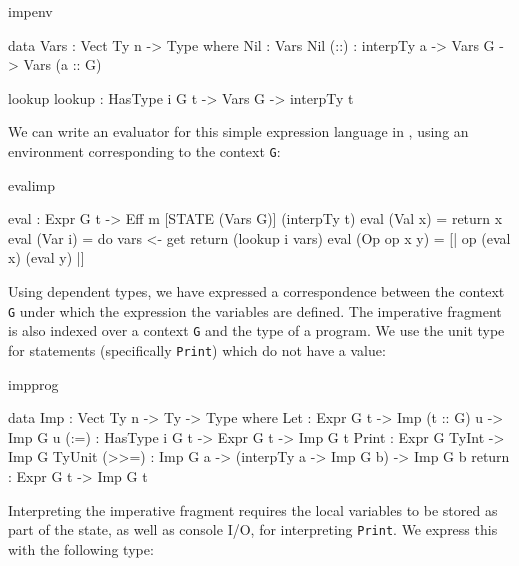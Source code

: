 \begin{SaveVerbatim}{impenv}

data Vars : Vect Ty n -> Type where
     Nil  : Vars Nil
     (::) : interpTy a -> Vars G -> Vars (a :: G)
\end{SaveVerbatim}

\begin{SaveVerbatim}{lookup}
lookup : HasType i G t -> Vars G -> interpTy t

\end{SaveVerbatim}

\noindent
We can write an evaluator for this simple expression language in
\Eff{}, using an environment corresponding to
the context \texttt{G}:

\begin{SaveVerbatim}{evalimp}

eval : Expr G t -> Eff m [STATE (Vars G)] (interpTy t)
eval (Val x) = return x
eval (Var i) = do vars <- get
                  return (lookup i vars) 
eval (Op op x y) = [| op (eval x) (eval y) |]

\end{SaveVerbatim}

\noindent
Using dependent types, we have expressed a correspondence between
the context \texttt{G} under which the expression 
the variables are defined.
The imperative fragment is also indexed over a context \texttt{G} and the
type of a program. We use the unit type for statements (specifically
\texttt{Print}) which do not have a value:

\begin{SaveVerbatim}{impprog}

data Imp    : Vect Ty n -> Ty -> Type where
     Let    : Expr G t -> Imp (t :: G) u -> Imp G u
     (:=)   : HasType i G t -> Expr G t -> Imp G t
     Print  : Expr G TyInt -> Imp G TyUnit
     (>>=)  : Imp G a -> 
              (interpTy a -> Imp G b) -> Imp G b 
     return : Expr G t -> Imp G t

\end{SaveVerbatim}

\noindent
Interpreting the imperative fragment requires the local variables to be
stored as part of the state, as well as console I/O, for interpreting
\texttt{Print}. We express this with the following type:

